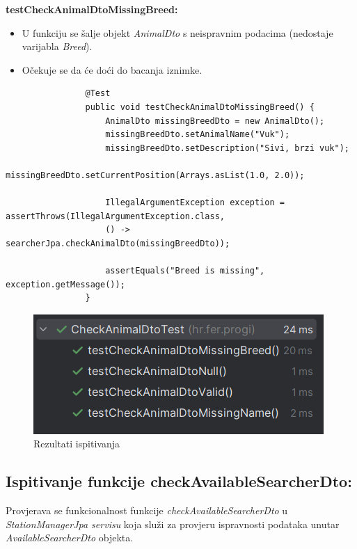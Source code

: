 			\textbf{testCheckAnimalDtoMissingBreed:}
			\begin{itemize}
				\item U funkciju se šalje objekt \textit{AnimalDto} s neispravnim podacima (nedostaje varijabla \textit{Breed}).
				\item Očekuje se da će doći do bacanja iznimke.
			\end{itemize}
			\begin{lstlisting}
				@Test
				public void testCheckAnimalDtoMissingBreed() {
					AnimalDto missingBreedDto = new AnimalDto();
					missingBreedDto.setAnimalName("Vuk");
					missingBreedDto.setDescription("Sivi, brzi vuk");
					missingBreedDto.setCurrentPosition(Arrays.asList(1.0, 2.0));
					
					IllegalArgumentException exception = assertThrows(IllegalArgumentException.class,
					() -> searcherJpa.checkAnimalDto(missingBreedDto));
					
					assertEquals("Breed is missing", exception.getMessage());
				}
			\end{lstlisting}
			
			\begin{figure}[H]
				\includegraphics[scale=1]{slike/checkAnimalDtoTest.png} 
				\centering
				\caption{Rezultati ispitivanja}
				\label{fig:checkAnimalDtoTest}
			\end{figure}
			
			\subsection{Ispitivanje funkcije checkAvailableSearcherDto:}
			Provjerava se funkcionalnost funkcije \textit{checkAvailableSearcherDto} u \textit{StationManagerJpa servisu} koja služi za provjeru ispravnosti podataka unutar \textit{AvailableSearcherDto} objekta.
			
